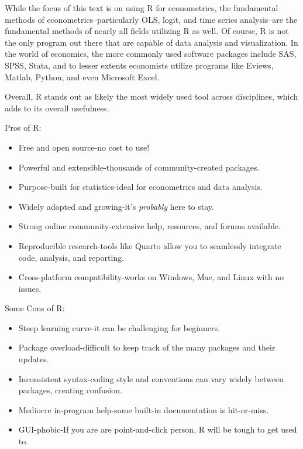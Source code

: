 \documentclass[
  letterpaper,
]{book}
\providecommand{\tightlist}{%
  \setlength{\itemsep}{0pt}\setlength{\parskip}{0pt}}\usepackage{longtable,booktabs,array}
\begin{document}
While the focus of this text is on using R for econometrics, the
fundamental methods of econometrics--particularly OLS, logit, and time
series analysis--are the fundamental methods of nearly all fields
utilizing R as well. Of course, R is not the only program out there that
are capable of data analysis and visualization. In the world of
economics, the more commonly used software packages include SAS, SPSS,
Stata, and to lesser extents economists utilize programs like Eviews,
Matlab, Python, and even Microsoft Excel.

Overall, R stands out as likely the most widely used tool across
disciplines, which adds to its overall usefulness.

Pros of R:

\begin{itemize}
\tightlist
\item
  Free and open source-no cost to use!
\item
  Powerful and extensible-thousands of community-created packages.
\item
  Purpose-built for statistics-ideal for econometrics and data analysis.
\item
  Widely adopted and growing-it's \emph{probably} here to stay.
\item
  Strong online community-extensive help, resources, and forums
  available.
\item
  Reproducible research-tools like Quarto allow you to seamlessly
  integrate code, analysis, and reporting.
\item
  Cross-platform compatibility-works on Windows, Mac, and Linux with no
  issues.
\end{itemize}

Some Cons of R:

\begin{itemize}
\tightlist
\item
  Steep learning curve-it can be challenging for beginners.
\item
  Package overload-difficult to keep track of the many packages and
  their updates.
\item
  Inconsistent syntax-coding style and conventions can vary widely
  between packages, creating confusion.
\item
  Mediocre in-program help-some built-in documentation is hit-or-miss.
\item
  GUI-phobic-If you are are point-and-click person, R will be tough to
  get used to.
\end{itemize}
\end{document}
